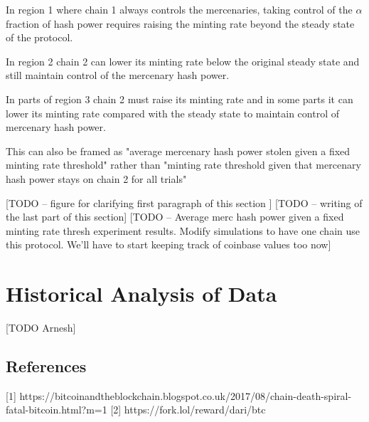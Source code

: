 \documentclass[10pt, preprint]{aastex}
\begin{document}
In region 1 where chain 1 always controls the mercenaries, taking control of the $\alpha$ fraction of hash power requires raising the minting rate beyond the steady state of the protocol.

In region 2 chain 2 can lower its minting rate below the original steady state and still maintain control of the mercenary hash power.

In parts of region 3 chain 2 must raise its minting rate and in some parts it can lower its minting rate compared with the steady state to maintain control of mercenary hash power.

This can also be framed as "average mercenary hash power stolen given a fixed minting rate threshold" rather than "minting rate threshold given that mercenary hash power stays on chain 2 for all trials"

[TODO -- figure for clarifying first paragraph of this section ]
[TODO -- writing of the last part of this section]
[TODO -- Average merc hash power given a fixed minting rate thresh experiment results.  Modify simulations to have one chain use this protocol.  We'll have to start keeping track of coinbase values too now]


\section{Historical Analysis of Data}
[TODO Arnesh]



\subsection{References}
[1] https://bitcoinandtheblockchain.blogspot.co.uk/2017/08/chain-death-spiral-fatal-bitcoin.html?m=1
[2] https://fork.lol/reward/dari/btc
\end{document}
